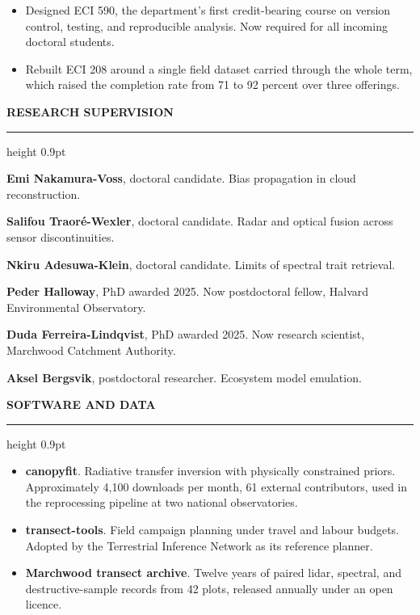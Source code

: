 \documentclass[10pt,a4paper]{article}
\newcommand{\cvsection}[1]{%
  \vspace{10pt}%
  {\normalsize\bfseries\MakeUppercase{#1}}%
  \vspace{2pt}\hrule height 0.9pt%
  \vspace{6pt}%
}
\newcommand{\cvsubsection}[1]{%
  \vspace{7pt}{\small\bfseries #1}\vspace{3pt}%
}
\newenvironment{dated}[1][2.4cm]{%
  \begin{list}{}{%
    \setlength{\labelwidth}{#1}%
    \setlength{\leftmargin}{\dimexpr#1+0.5cm\relax}%
    \setlength{\labelsep}{0.5cm}%
    \setlength{\itemsep}{4pt}%
    \setlength{\parsep}{2pt}%
    \setlength{\topsep}{2pt}%
    \renewcommand{\makelabel}[1]{\small##1\hfill}%
  }%
}{\end{list}}
\begin{document}
\vspace{5pt}
\cvsubsection{Curriculum development}
\begin{itemize}[leftmargin=1.2em,itemsep=2pt,topsep=2pt]
  \item Designed ECI 590, the department's first credit-bearing course on version control, testing,
    and reproducible analysis. Now required for all incoming doctoral students.
  \item Rebuilt ECI 208 around a single field dataset carried through the whole term, which raised
    the completion rate from 71 to 92 percent over three offerings.
\end{itemize}

\cvsection{Research supervision}

\begin{dated}[2.4cm]
  \item[2023 -- present] \textbf{Emi Nakamura-Voss}, doctoral candidate. Bias propagation in cloud
    reconstruction.
  \item[2023 -- present] \textbf{Salifou Traoré-Wexler}, doctoral candidate. Radar and optical
    fusion across sensor discontinuities.
  \item[2022 -- present] \textbf{Nkiru Adesuwa-Klein}, doctoral candidate. Limits of spectral trait
    retrieval.
  \item[2021 -- 2025] \textbf{Peder Halloway}, PhD awarded 2025. Now postdoctoral fellow, Halvard
    Environmental Observatory.
  \item[2021 -- 2025] \textbf{Duda Ferreira-Lindqvist}, PhD awarded 2025. Now research scientist,
    Marchwood Catchment Authority.
  \item[2022 -- present] \textbf{Aksel Bergsvik}, postdoctoral researcher. Ecosystem model
    emulation.
\end{dated}

\cvsection{Software and data}

\begin{itemize}[leftmargin=1.2em,itemsep=3pt,topsep=2pt]
  \item \textbf{canopyfit}. Radiative transfer inversion with physically constrained priors.
    Approximately 4{,}100 downloads per month, 61 external contributors, used in the reprocessing
    pipeline at two national observatories.
  \item \textbf{transect-tools}. Field campaign planning under travel and labour budgets. Adopted
    by the Terrestrial Inference Network as its reference planner.
  \item \textbf{Marchwood transect archive}. Twelve years of paired lidar, spectral, and
    destructive-sample records from 42 plots, released annually under an open licence.
\end{itemize}
\end{document}

